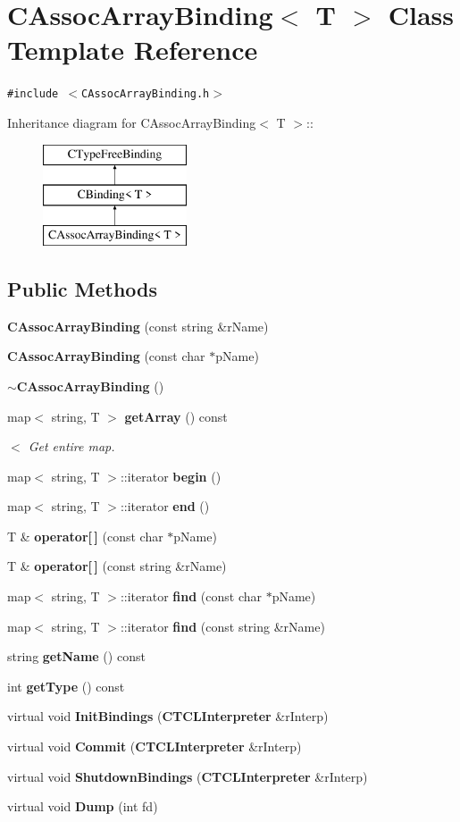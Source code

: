 \section{CAssoc\-Array\-Binding$<$ T $>$  Class Template Reference}
\label{classCAssocArrayBinding}
{\tt \#include $<$CAssoc\-Array\-Binding.h$>$}

Inheritance diagram for CAssoc\-Array\-Binding$<$ T $>$::\begin{figure}[H]
\begin{center}
\leavevmode
\includegraphics[height=3cm]{classCAssocArrayBinding}
\end{center}
\end{figure}
\subsection*{Public Methods}
\begin{CompactItemize}
\item 
{\bf CAssoc\-Array\-Binding} (const string \&r\-Name)
\item 
{\bf CAssoc\-Array\-Binding} (const char $\ast$p\-Name)
\item 
{\bf $\sim$CAssoc\-Array\-Binding} ()
\item 
map$<$ string, T $>$ {\bf get\-Array} () const
\begin{CompactList}\small\item\em $<$ Get entire map.\item\end{CompactList}\item 
map$<$ string, T $>$::iterator {\bf begin} ()
\item 
map$<$ string, T $>$::iterator {\bf end} ()
\item 
T \& {\bf operator[$\,$]} (const char $\ast$p\-Name)
\item 
T \& {\bf operator[$\,$]} (const string \&r\-Name)
\item 
map$<$ string, T $>$::iterator {\bf find} (const char $\ast$p\-Name)
\item 
map$<$ string, T $>$::iterator {\bf find} (const string \&r\-Name)
\item 
string {\bf get\-Name} () const
\item 
int {\bf get\-Type} () const
\item 
virtual void {\bf Init\-Bindings} ({\bf CTCLInterpreter} \&r\-Interp)
\item 
virtual void {\bf Commit} ({\bf CTCLInterpreter} \&r\-Interp)
\item 
virtual void {\bf Shutdown\-Bindings} ({\bf CTCLInterpreter} \&r\-Interp)
\item 
virtual void {\bf Dump} (int fd)
\end{CompactItemize}
